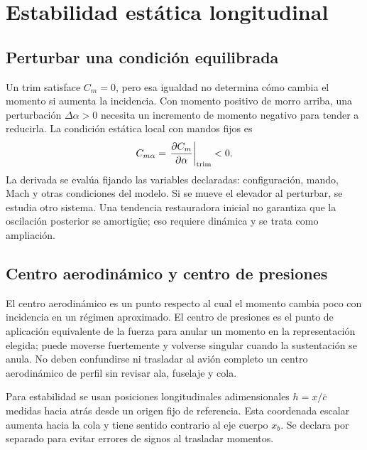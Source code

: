 \chapter{Estabilidad estática longitudinal}\label{ch:long-static}

\section{Perturbar una condición equilibrada}
Un trim satisface $C_m=0$, pero esa igualdad no determina cómo cambia el momento si aumenta la incidencia. Con momento positivo de morro arriba, una perturbación $\Delta\alpha>0$ necesita un incremento de momento negativo para tender a reducirla. La condición estática local con mandos fijos es
\begin{equation}
C_{m\alpha}=\left.\frac{\partial C_m}{\partial\alpha}\right|_{\rm trim}<0.
\end{equation}
La derivada se evalúa fijando las variables declaradas: configuración, mando, Mach y otras condiciones del modelo. Si se mueve el elevador al perturbar, se estudia otro sistema. Una tendencia restauradora inicial no garantiza que la oscilación posterior se amortigüe; eso requiere dinámica y se trata como ampliación.


\section{Centro aerodinámico y centro de presiones}
El centro aerodinámico es un punto respecto al cual el momento cambia poco con incidencia en un régimen aproximado. El centro de presiones es el punto de aplicación equivalente de la fuerza para anular un momento en la representación elegida; puede moverse fuertemente y volverse singular cuando la sustentación se anula. No deben confundirse ni trasladar al avión completo un centro aerodinámico de perfil sin revisar ala, fuselaje y cola.

Para estabilidad se usan posiciones longitudinales adimensionales $h=x/\bar c$ medidas hacia atrás desde un origen fijo de referencia. Esta coordenada escalar aumenta hacia la cola y tiene sentido contrario al eje cuerpo $x_b$. Se declara por separado para evitar errores de signos al trasladar momentos.

